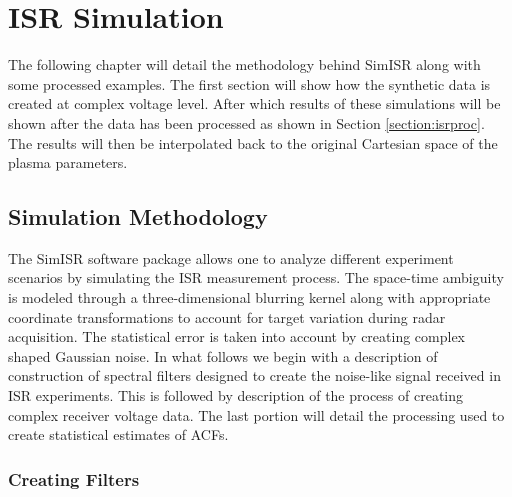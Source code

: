 \chapter{ISR Simulation}
\label{chapter:stisrs}
\thispagestyle{myheadings}

\graphicspath{{4_STISRS/Figures/}}


The following chapter will detail the methodology behind SimISR along with some processed examples. The first section will show how the synthetic data is created at complex voltage level. After which results of these simulations will be shown after the data has been processed as shown in Section \ref{section:isrproc}. The results will then be interpolated back to the original Cartesian space of the plasma parameters. 

\section{Simulation Methodology}
\label{sec:simmeth}
The SimISR software package allows one to analyze different  experiment scenarios by simulating the ISR measurement process. %
The space-time ambiguity is modeled through a three-dimensional blurring kernel along with appropriate coordinate transformations to account for target variation during radar acquisition.   The statistical error is taken into account by creating complex shaped Gaussian noise.    
In what follows we begin with a description of construction of spectral filters designed to create the noise-like signal received in ISR experiments. This is followed by description of the process of creating complex receiver voltage data. The last portion will detail the processing used to create statistical estimates of ACFs.

\subsection{Creating Filters}

